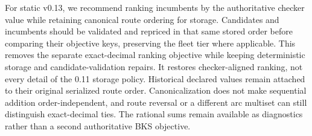 For static v0.13, we recommend ranking incumbents by the authoritative checker value while retaining canonical route ordering for storage. Candidates and incumbents should be validated and repriced in that same stored order before comparing their objective keys, preserving the fleet tier where applicable. This removes the separate exact-decimal ranking objective while keeping deterministic storage and candidate-validation repairs. It restores checker-aligned ranking, not every detail of the 0.11 storage policy. Historical declared values remain attached to their original serialized route order. Canonicalization does not make sequential addition order-independent, and route reversal or a different arc multiset can still distinguish exact-decimal ties. The rational sums remain available as diagnostics rather than a second authoritative BKS objective.
